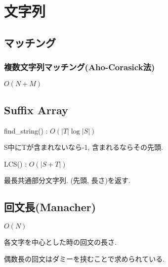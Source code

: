 
\section{文字列}
\subsection{マッチング}
\subsubsection{複数文字列マッチング(Aho-Corasick法)}
$O(N+M)$\par


\subsection{Suffix Array}
find\_string() : $O(|T|\log |S|)$\par
S中にTが含まれないなら-1, 含まれるならその先頭.\par
LCS() : $O(|S+T|)$\par
最長共通部分文字列. (先頭, 長さ)を返す.



\subsection{回文長(Manacher)}
$O(N)$\par
各文字を中心とした時の回文の長さ.\par
偶数長の回文はダミーを挟むことで求められている.\par

